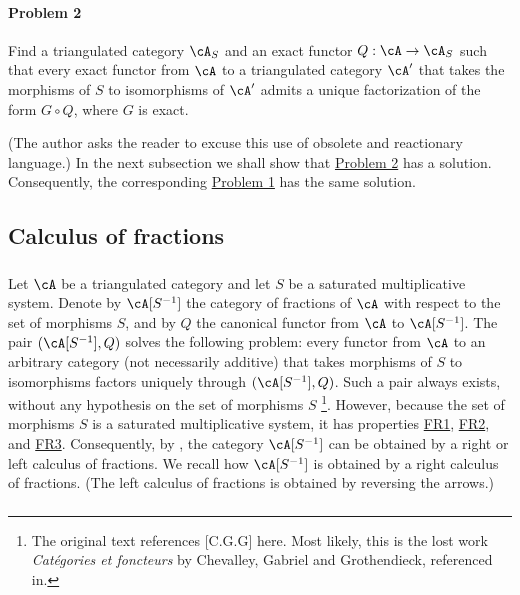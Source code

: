 \paragraph{Problem 2}
\hypertarget{VIII:prob2}{}
Find a triangulated category $\cA_S$ and an exact functor
$Q:\cA\to \cA_S$ such that every exact functor from $\cA$ to a
triangulated category $\cA'$ that takes the morphisms of $S$ to
isomorphisms of $\cA'$ admits a unique factorization of the form
$G\circ Q$, where $G$ is exact.

(The author asks the reader to excuse this use of obsolete and reactionary
language.) In the next subsection we shall show that
\hyperlink{VIII:prob2}{Problem 2} has a solution. Consequently, the
corresponding \hyperlink{VIII:prob1}{Problem 1} has the same solution.

\subsection{Calculus of fractions}\label{VIII:2-3}

\subsubsection{}\label{VIII:2-3-1}

Let $\cA$ be a triangulated category and let $S$ be a saturated
multiplicative system. Denote by $\cA[S^{-1}]$ the category of fractions
of $\cA$ with respect to the set of morphisms $S$, and by $Q$ the
canonical functor from $\cA$ to $\cA[S^{-1}]$. The pair
$(\cA[S^{-1}],Q)$ solves the following problem: every functor from $\cA$
to an arbitrary category (not necessarily additive) that takes morphisms
of $S$ to isomorphisms factors uniquely through $(\cA[S^{-1}],Q)$. Such
a pair always exists, without any hypothesis on the set of morphisms $S$
\cite[1.1]{gz67}\footnote{The original text references [C.G.G] here. Most
likely, this is the lost work \emph{Catégories et foncteurs} by Chevalley,
Gabriel and Grothendieck, referenced in\cite{sc72}. }. However, because the
set of morphisms $S$ is a saturated multiplicative system, it has
properties \hyperlink{VIII:FR1}{FR1}, \hyperlink{VIII:FR2}{FR2}, and
\hyperlink{VIII:FR3}{FR3}. Consequently, by \cite{gz67}, the category
$\cA[S^{-1}]$ can be obtained by a right or left calculus of fractions.
We recall how $\cA[S^{-1}]$ is obtained by a right calculus of fractions.
(The left calculus of fractions is obtained by reversing the arrows.)

\subsubsection{}\label{VIII:2-3-2}

